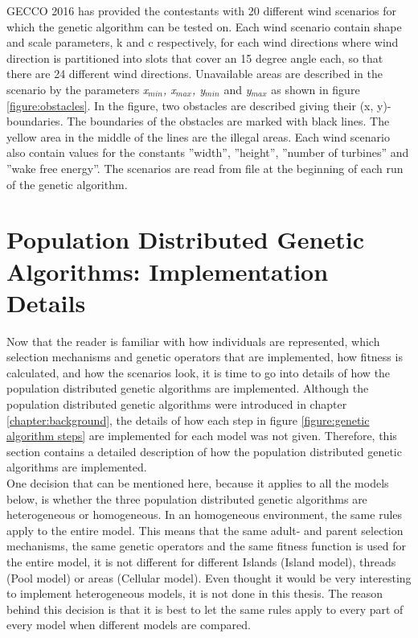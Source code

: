 GECCO 2016 has provided the contestants with 20 different wind scenarios for which the genetic algorithm can be tested on. Each wind scenario contain shape and scale parameters, k and c respectively, for each wind directions where wind direction is partitioned into slots that cover an 15 degree angle each, so that there are 24 different wind directions. Unavailable areas are described in the scenario by the parameters \textit{x$_{min}$, x$_{max}$, y$_{min}$} and \textit{y$_{max}$} as shown in figure \ref{figure:obstacles}. In the figure, two obstacles are described giving their (x, y)-boundaries. The boundaries of the obstacles are marked with black lines. The yellow area in the middle of the lines are the illegal areas. Each wind scenario also contain values for the constants ''width'', ''height'', ''number of turbines'' and ''wake free energy''. The scenarios are read from file at the beginning of each run of the genetic algorithm. 


\section{Population Distributed Genetic Algorithms: Implementation Details}\label{section:population distributed gas implementation details}


Now that the reader is familiar with how individuals are represented, which selection mechanisms and genetic operators that are implemented, how fitness is calculated, and how the scenarios look, it is time to go into details of how the population distributed genetic algorithms are implemented. Although the population distributed genetic algorithms were introduced in chapter \ref{chapter:background}, the details of how each step in figure \ref{figure:genetic algorithm steps} are implemented for each model was not given. Therefore, this section contains a detailed description of how the population distributed genetic algorithms are implemented. \\


\noindent One decision that can be mentioned here, because it applies to all the models below, is whether the three population distributed genetic algorithms are heterogeneous or homogeneous. In an homogeneous environment, the same rules apply to the entire model. This means that the same adult- and parent selection mechanisms, the same genetic operators and the same fitness function is used for the entire model, it is not different for different Islands (Island model), threads (Pool model) or areas (Cellular model). Even thought it would be very interesting to implement heterogeneous models, it is not done in this thesis. The reason behind this decision is that it is best to let the same rules apply to every part of every model when different models are compared.\\


